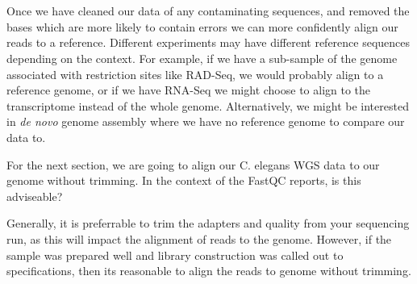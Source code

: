 
\chapter{\moduleTitle}
\newpage


\begin{note}
Once we have cleaned our data of any contaminating sequences, and removed the bases which are more likely to contain errors we can more confidently align our reads to a reference.
Different experiments may have different reference sequences depending on the context.
For example, if we have a sub-sample of the genome associated with restriction sites like RAD-Seq, we would probably align to a reference genome, or if we have RNA-Seq we might choose to align to the transcriptome instead of the whole genome.
Alternatively, we might be interested in \textit{de novo} genome assembly where we have no reference genome to compare our data to.
\end{note}

\begin{questions}
For the next section, we are going to align our C. elegans WGS data to our genome without trimming. In the context of the FastQC reports, is this adviseable? \\
\begin{answer}
Generally, it is preferrable to trim the adapters and quality from your sequencing run, as this will impact the alignment of reads to the genome. However, if the sample was prepared well and library construction was called out to specifications, then its reasonable to align the reads to genome without trimming. \\
\end{answer}
\end{questions}

